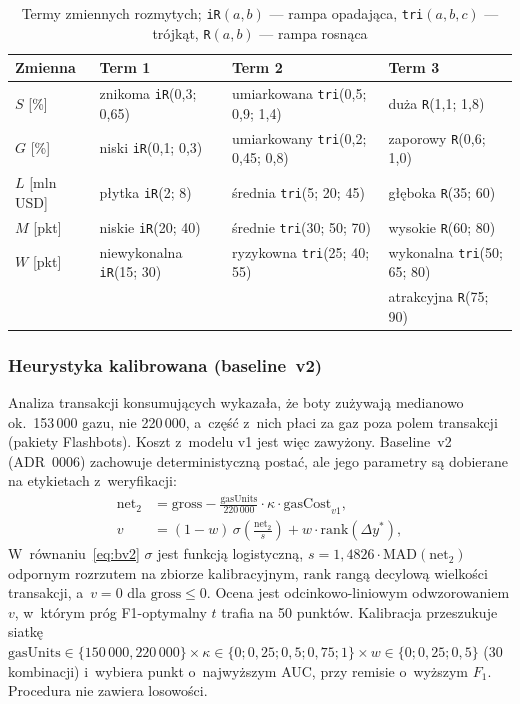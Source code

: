 \begin{table}[H]\centering\footnotesize
\caption{Termy zmiennych rozmytych; \texttt{iR}$(a,b)$ --- rampa opadająca,
  \texttt{tri}$(a,b,c)$ --- trójkąt, \texttt{R}$(a,b)$ --- rampa rosnąca}\label{tab:terms}
\begin{tabular}{llll}
\toprule
Zmienna & Term 1 & Term 2 & Term 3 \\
\midrule
$S$ [\%] & znikoma \texttt{iR}(0{,}3; 0{,}65) & umiarkowana \texttt{tri}(0{,}5; 0{,}9; 1{,}4) & duża \texttt{R}(1{,}1; 1{,}8) \\
$G$ [\%] & niski \texttt{iR}(0{,}1; 0{,}3) & umiarkowany \texttt{tri}(0{,}2; 0{,}45; 0{,}8) & zaporowy \texttt{R}(0{,}6; 1{,}0) \\
$L$ [mln USD] & płytka \texttt{iR}(2; 8) & średnia \texttt{tri}(5; 20; 45) & głęboka \texttt{R}(35; 60) \\
$M$ [pkt] & niskie \texttt{iR}(20; 40) & średnie \texttt{tri}(30; 50; 70) & wysokie \texttt{R}(60; 80) \\
\midrule
$W$ [pkt] & niewykonalna \texttt{iR}(15; 30) & ryzykowna \texttt{tri}(25; 40; 55) & wykonalna \texttt{tri}(50; 65; 80) \\
          &                                  &                                    & atrakcyjna \texttt{R}(75; 90) \\
\bottomrule
\end{tabular}
\end{table}



\subsubsection{Heurystyka kalibrowana (baseline~v2)}
Analiza transakcji konsumujących wykazała, że boty zużywają medianowo ok.~153\,000 gazu, nie
220\,000, a~część z~nich płaci za gaz poza polem transakcji (pakiety Flashbots). Koszt z~modelu
v1 jest więc zawyżony. Baseline~v2 (ADR~0006) zachowuje deterministyczną postać, ale jego
parametry są dobierane na etykietach z~weryfikacji:
\begin{align}
  \mathrm{net}_2 &= \mathrm{gross} - \frac{\mathrm{gasUnits}}{220\,000}\cdot \kappa \cdot
  \mathrm{gasCost}_{v1}, \label{eq:bv2}\\
  v &= (1-w)\,\sigma\!\left(\frac{\mathrm{net}_2}{s}\right) + w\cdot \mathrm{rank}(\Delta y^{*}),
  \nonumber
\end{align}
W~równaniu~\eqref{eq:bv2} $\sigma$ jest funkcją logistyczną, $s=1{,}4826\cdot\mathrm{MAD}(\mathrm{net}_2)$ odpornym
rozrzutem na zbiorze kalibracyjnym, $\mathrm{rank}$ rangą decylową wielkości transakcji, a~$v=0$
dla $\mathrm{gross}\le 0$. Ocena jest odcinkowo-liniowym odwzorowaniem $v$, w~którym próg
F1-optymalny $t$ trafia na 50 punktów. Kalibracja przeszukuje siatkę $\mathrm{gasUnits}\in
\{150\,000, 220\,000\}\times\kappa\in\{0;0{,}25;0{,}5;0{,}75;1\}\times w\in\{0;0{,}25;0{,}5\}$
(30 kombinacji) i~wybiera punkt o~najwyższym AUC, przy remisie o~wyższym $F_1$. Procedura nie
zawiera losowości.

